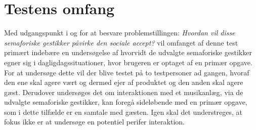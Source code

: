 \section{Testens omfang}
\label{TestensOmfangSocialAccept}
%
Med udgangspunkt i og for at besvare problemstillingen: \textit{Hvordan vil disse semaforiske gestikker påvirke den sociale accept?} vil omfanget af denne test primært indebære en undersøgelse af hvorvidt de udvalgte semaforiske gestikker egner sig i dagligdagssituationer, hvor brugeren er optaget af en primær opgave. For at undersøge dette vil der blive testet på to testpersoner ad gangen, hvoraf den ene skal agere vært og dermed ejer af produktet og den anden skal agere gæst. Derudover undersøges det om interaktionen med et musikanlæg, via de udvalgte semaforiske gestikker, kan foregå sideløbende med en primær opgave, som i dette tilfælde er en samtale med gæsten. Igen skal det understreges, at fokus ikke er at undersøge en potentiel perifer interaktion. 

